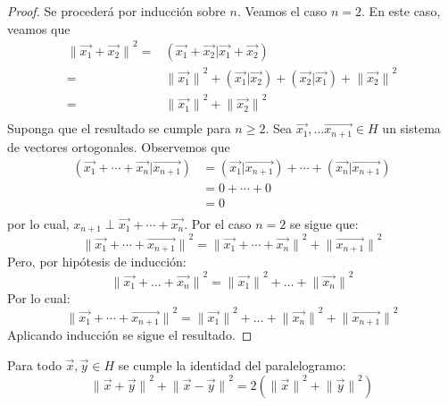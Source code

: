 \documentclass[12pt]{report}
\theoremstyle{largebreak}
\newcommand\norm[1]{\ensuremath{\|#1\|}}
\newcommand\pint[2]{\ensuremath{\left(#1\big| #2\right)}}
\begin{document}
    \begin{proof}
        Se procederá por inducción sobre $n$. Veamos el caso $n=2$. En este caso, veamos que
        \begin{equation*}
            \begin{split}
                \norm{\vec{x_1}+\vec{x_2}}^2=&\pint{\vec{x_1}+\vec{x_2}}{\vec{x_1}+\vec{x_2}}\\
                =&\norm{\vec{x_1}}^2+\pint{\vec{x_1}}{\vec{x_2}}+\pint{\vec{x_2}}{\vec{x_1}}+\norm{\vec{x_2}}^2\\
                =&\norm{\vec{x_1}}^2+\norm{\vec{x_2}}^2\\
            \end{split}
        \end{equation*}
        Suponga que el resultado se cumple para $n\geq2$. Sea $\vec{x_1},...\vec{x_{n+1}}\in H$ un sistema de vectores ortogonales. Observemos que
        \begin{equation*}
            \begin{split}
                \pint{\vec{x_1}+\cdots+\vec{x_n}}{\vec{x_{n+1}}}&=\pint{\vec{x_1}}{\vec{x_{n+1}}}+\cdots+\pint{\vec{x_n}}{\vec{x_{n+1}}}\\
                &=0+\cdots+0\\
                &=0\\
            \end{split}
        \end{equation*}
        por lo cual, $x_{n+1}\perp\vec{x_1}+\cdots+\vec{x_n}$. Por el caso $n=2$ se sigue que:
        \begin{equation*}
            \norm{\vec{x_1}+\cdots+\vec{x_{n+1}}}^2=\norm{\vec{x_1}+\cdots+\vec{x_n}}^2+\norm{\vec{x_{n+1}}}^2
        \end{equation*}
        Pero, por hipótesis de inducción:
        \begin{equation*}
            \norm{\vec{x_1}+\dots+\vec{x_n}}^2=\norm{\vec{x_1}}^2+\dots+\norm{\vec{x_n}}^2
        \end{equation*}
        Por lo cual:
        \begin{equation*}
            \norm{\vec{x_1}+\cdots+\vec{x_{n+1}}}^2=\norm{\vec{x_1}}^2+\dots+\norm{\vec{x_n}}^2+\norm{\vec{x_{n+1}}}^2
        \end{equation*}
        Aplicando inducción se sigue el resultado.
    \end{proof}

    \begin{propo}
        Para todo $\vec{x},\vec{y}\in H$ se cumple la identidad del paralelogramo:
        \begin{equation*}
            \norm{\vec{x}+\vec{y}}^2+\norm{\vec{x}-\vec{y}}^2=2(\norm{\vec{x}}^2+\norm{\vec{y}}^2)
        \end{equation*}
    \end{propo}
\end{document}
